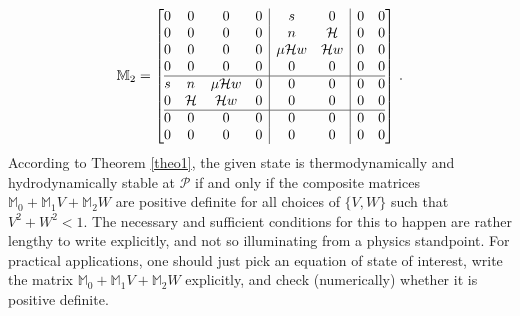\documentclass[a4paper, amsfonts, amssymb, amsmath, reprint, showkeys, nofootinbib, twoside,notitlepage,onecolumn]{revtex4-2}
\theoremstyle{definition}
\theoremstyle{theorem}
\theoremstyle{corollary}
\begin{document}
\begin{equation}
\mathbb{M}_2 =
\left[
\begin{array}{@{}cccc|cc|cc@{}}
0 & 0 & 0 & 0 & s & 0 & 0 & 0\\
0 & 0 & 0 & 0 & n & \mathcal{H} & 0 & 0\\
0 & 0 & 0 & 0 & \mu \mathcal{H}w & \mathcal{H}w & 0 & 0\\
0 & 0 & 0 & 0 & 0 & 0 & 0 & 0\\
\hline
s & n & \mu \mathcal{H}w & 0 & 0 & 0 & 0 & 0\\
0 & \mathcal{H} & \mathcal{H}w & 0 & 0 & 0 & 0 & 0\\
\hline
0 & 0 & 0 & 0 & 0 & 0 & 0 & 0\\
0 & 0 & 0 & 0 & 0 & 0 & 0 & 0\\
\end{array} 
\right] \, .
\end{equation}
According to Theorem \ref{theo1}, the given state is thermodynamically and hydrodynamically stable at $\mathscr{P}$ if and only if the composite matrices $\mathbb{M}_0{+}\mathbb{M}_1 V {+}\mathbb{M}_2 W$ are positive definite for all choices of $\{ V,W\}$ such that $V^2 {+}W^2 < 1$. The necessary and sufficient conditions for this to happen are rather lengthy to write explicitly, and not so illuminating from a physics standpoint. For practical applications, one should just pick an equation of state of interest, write the matrix $\mathbb{M}_0{+}\mathbb{M}_1 V {+}\mathbb{M}_2 W$ explicitly, and check (numerically) whether it is positive definite.
\end{document}
